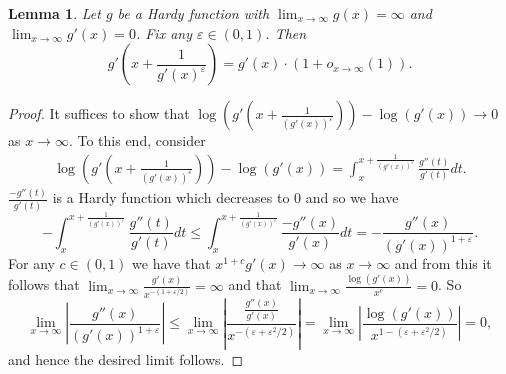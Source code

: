 \documentclass[12pt]{article}
\theoremstyle{plain} %
\newtheorem{lemma}[theorem]{Lemma}
\theoremstyle{definition} %
\theoremstyle{plain}
\theoremstyle{plain}
\numberwithin{equation}{section}
\renewcommand{\epsilon}{\varepsilon}
\renewcommand{\leq}{\leqslant}
\newcommand{\1}{\mathbbm{1}}
\newcommand{\oo}{\infty}
\begin{document}
\begin{lemma}\label{lem:shift_inequality}
    Let $g$ be a Hardy function with $\lim_{x\to\oo}g(x)=\oo$ and $\lim_{x\to\oo}g'(x)=0$. Fix any $\epsilon\in (0,1)$. Then
\begin{equation}\label{eq:shift_inequality}
        g'\left(x+\frac{1}{g'(x)^{\epsilon}}\right)=g'(x) \cdot (1+o_{x\to\oo}(1)). 
    \end{equation}
\end{lemma}
\begin{proof}
It suffices to show that $\log\left({g'(x+\frac{1}{(g'(x))^{\epsilon}})}\right)-\log\left({g'(x)}\right)\to 0$ as $x\to\oo$. To this end, consider
\begin{align}
  \log\left(g'(x+\frac{1}{(g'(x))^{\epsilon}})\right)-\log\left({g'(x)}\right) = \int_{x}^{x+\frac{1}{(g'(x))^{\epsilon}}}\frac{g''(t)}{g'(t)}dt.
\end{align}
    $\frac{-g''(t)}{g'(t)}$ is a Hardy function which decreases to $0$ and so we have 
    \[
    -\int_{x}^{x+\frac{1}{(g'(x))^{\epsilon}}}\frac{g''(t)}{g'(t)}dt \leq \int_{x}^{x+\frac{1}{(g'(x))^{\epsilon}}}\frac{-g''(x)}{g'(x)}dt = -\frac{g''(x)}{(g'(x))^{1+\epsilon}}.
    \]
    For any $c\in (0,1)$ we have that $x^{1+c}g'(x)\to \oo$ as $x\to\oo$ and from this it follows that $\lim_{x\to\oo}\frac{g'(x)}{x^{-(1+\epsilon/2)}}=\oo$ and that $\lim_{x\to\oo}\frac{\log(g'(x))}{x^c}=0$. So 
    \[
    \lim_{x\to\oo}\left|\frac{g''(x)}{(g'(x))^{1+\epsilon}}\right| \leq \lim_{x\to\oo}\left|\frac{\frac{g''(x)}{g'(x)}}{x^{-(\epsilon+\epsilon^2/2)}}\right|=\lim_{x\to\oo}\left|\frac{\log(g'(x))}{x^{1-(\epsilon+\epsilon^2/2)}}\right|=0,
    \]
    and hence the desired limit follows.
\end{proof}
\end{document}
